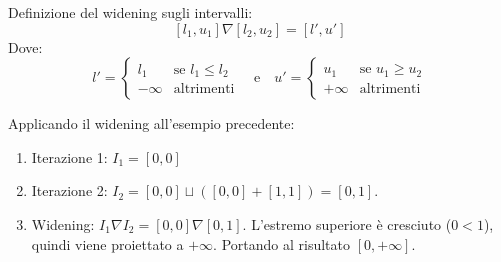 Definizione del widening sugli intervalli:
\[
[l_1, u_1] \nabla [l_2, u_2] = [l', u']
\]
Dove:
\[
l' = \begin{cases} l_1 & \text{se } l_1 \le l_2 \\ -\infty & \text{altrimenti} \end{cases}
\quad \text{e} \quad
u' = \begin{cases} u_1 & \text{se } u_1 \ge u_2 \\ +\infty & \text{altrimenti} \end{cases}
\]

Applicando il widening all'esempio precedente:
\begin{enumerate}
    \item Iterazione 1: $I_1 = [0, 0]$
    \item Iterazione 2: $I_2 = [0, 0] \sqcup ([0, 0] + [1, 1]) = [0, 1]$.
    \item Widening: $I_1 \nabla I_2 = [0, 0] \nabla [0, 1]$. L'estremo
    superiore è cresciuto ($0 < 1$), quindi viene proiettato a $+\infty$.
    Portando al risultato $[0, +\infty]$.
\end{enumerate}
